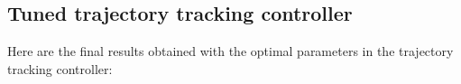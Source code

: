 \documentclass[11pt,a4paper]{article}
\begin{document}

\subsection{Tuned trajectory tracking controller}

Here are the final results obtained with the optimal parameters in the trajectory tracking controller:

\begin{figure}[H]
    \centering
    \quad
\end{figure}
\end{document}
